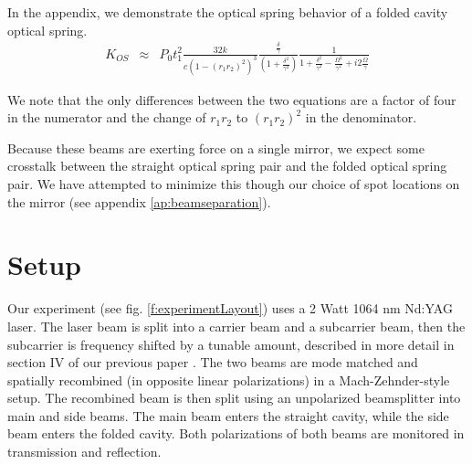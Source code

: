 In the appendix, we demonstrate the optical spring behavior of a folded cavity optical spring.
\begin{eqnarray}
\label{eq:KOSfolded}
K_{OS} & {\approx} & P_0 t_1^2 \frac{32k}{c(1-(r_1r_2)^2)^3}\frac{ \frac{\delta}{\gamma}}{(1+\frac{\delta^2}{\gamma^2})} 
\frac{1}{1+\frac{\delta^2}{\gamma^2}-\frac{\Omega^2}{\gamma^2}+i2\frac{\Omega}{\gamma} }
\end{eqnarray}

We note that the only differences between the two equations are a factor of four in the numerator and the change of $r_1r_2$ to $(r_1r_2)^2$ in the denominator.

Because these beams are exerting force on a single mirror, we expect some crosstalk between the straight optical spring pair and the folded optical spring pair. We have attempted to minimize this though our choice of spot locations on the mirror (see appendix \ref{ap:beamseparation}).


\section{Setup}
Our experiment (see fig. \ref{f:experimentLayout}) uses a 2 Watt 1064 nm Nd:YAG laser. The laser beam is split into a carrier beam and a subcarrier beam, then the subcarrier is frequency shifted by a tunable amount, described in more detail in section IV of our previous paper \cite{Kelley15}. The two beams are mode matched and spatially recombined (in opposite linear polarizations) in a Mach-Zehnder-style setup. The recombined beam is then split using an unpolarized beamsplitter into main and side beams. The main beam enters the straight cavity, while the side beam enters the folded cavity. Both polarizations of both beams are monitored in transmission and reflection.



